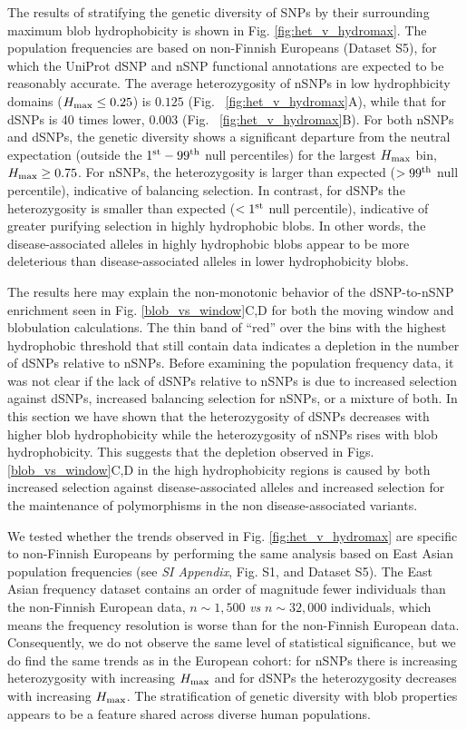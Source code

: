 \documentclass[9pt,twocolumn,twoside,lineno]{pnas-new}
\newcommand{\cmax}{H_{\rm max}}
\begin{document}
The results of stratifying the genetic diversity of SNPs by their surrounding maximum blob hydrophobicity is shown in Fig. \ref{fig:het_v_hydromax}. 
The population frequencies are based on non-Finnish Europeans \cite{Karczewski2021} (Dataset S5), for which the UniProt dSNP and nSNP functional annotations are expected to be reasonably accurate.
The average heterozygosity of nSNPs in low hydrophbicity domains ($\cmax\le 0.25$) is $0.125$ (Fig. ~\ref{fig:het_v_hydromax}A), while that for dSNPs is 40 times lower, 0.003 (Fig. ~\ref{fig:het_v_hydromax}B). For both nSNPs and dSNPs, the genetic diversity shows a significant departure from the neutral expectation (outside the $1^{\rm st}-99^{\rm th}$ null percentiles) for the largest $\cmax$ bin, $\cmax \geq 0.75$. For nSNPs, the heterozygosity is larger than expected ($>99^{\rm th}$ null percentile), indicative of balancing selection. In contrast, for dSNPs the heterozygosity is smaller than expected ($<1^{\rm st}$ null percentile), indicative of greater purifying selection in highly hydrophobic blobs. In other words, the disease-associated alleles in highly hydrophobic blobs appear to be more deleterious than disease-associated alleles in lower hydrophobicity blobs. 

The results here may explain the non-monotonic behavior of the dSNP-to-nSNP enrichment seen in Fig. \ref{blob_vs_window}C,D for both the moving window and blobulation calculations. The thin band of ``red'' over the bins with the highest hydrophobic threshold that still contain data indicates a depletion in the number of dSNPs relative to nSNPs. Before examining the population frequency data, it was not clear if the lack of dSNPs relative to nSNPs is due to increased selection against dSNPs, increased balancing selection for nSNPs, or a mixture of both. In this section we have shown that the heterozygosity of dSNPs decreases with higher blob hydrophobicity while the heterozygosity of nSNPs rises with blob hydrophobicity. This suggests that the depletion observed in Figs. \ref{blob_vs_window}C,D in the high hydrophobicity regions is caused by both increased selection against disease-associated alleles and increased selection for the maintenance of polymorphisms in the non disease-associated variants. 

We tested whether the trends observed in Fig. \ref{fig:het_v_hydromax} are specific to non-Finnish Europeans by performing the same analysis based on East Asian population frequencies (see {\em SI Appendix}, Fig. S1, and Dataset S5).
The East Asian frequency dataset contains an order of magnitude fewer individuals than the non-Finnish European data, $n\sim 1,500$ {\it vs} $n\sim 32,000$ individuals, which means the frequency resolution is worse than for the non-Finnish European data. Consequently, we do not observe the same level of statistical significance, but we do find the same trends as in the European cohort: for nSNPs there is increasing heterozygosity with increasing $\cmax$ and for dSNPs the heterozygosity decreases with increasing $\cmax$. The stratification of genetic diversity with blob properties appears to be a feature shared across diverse human populations.
\end{document}
